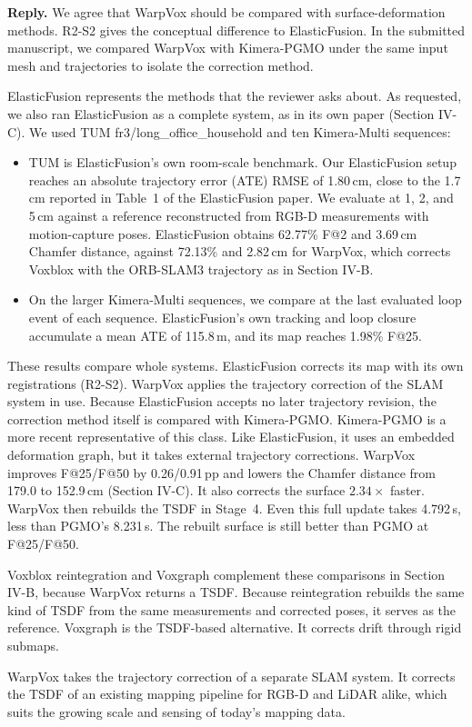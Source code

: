 \documentclass[11pt,a4paper]{article}
\newenvironment{reply}{\begingroup\color{replyblue}\textbf{Reply.} }{\par\endgroup}
\begin{document}
\begin{reply}
We agree that WarpVox should be compared with surface-deformation methods. R2-S2 gives the conceptual difference to ElasticFusion. In the submitted manuscript, we compared WarpVox with Kimera-PGMO under the same input mesh and trajectories to isolate the correction method.

ElasticFusion represents the methods that the reviewer asks about. As requested, we also ran ElasticFusion as a complete system, as in its own paper (Section IV-C). We used TUM fr3/long\_office\_household and ten Kimera-Multi sequences:
\begin{itemize}[leftmargin=*,topsep=2pt,itemsep=2pt]
\item TUM is ElasticFusion's own room-scale benchmark. Our ElasticFusion setup reaches an absolute trajectory error (ATE) RMSE of 1.80\,cm, close to the 1.7\,cm reported in Table~1 of the ElasticFusion paper. We evaluate at 1, 2, and 5\,cm against a reference reconstructed from RGB-D measurements with motion-capture poses. ElasticFusion obtains 62.77\% F@2 and 3.69\,cm Chamfer distance, against 72.13\% and 2.82\,cm for WarpVox, which corrects Voxblox with the ORB-SLAM3 trajectory as in Section IV-B.
\item On the larger Kimera-Multi sequences, we compare at the last evaluated loop event of each sequence. ElasticFusion's own tracking and loop closure accumulate a mean ATE of 115.8\,m, and its map reaches 1.98\% F@25.
\end{itemize}
These results compare whole systems. ElasticFusion corrects its map with its own registrations (R2-S2). WarpVox applies the trajectory correction of the SLAM system in use. Because ElasticFusion accepts no later trajectory revision, the correction method itself is compared with Kimera-PGMO. Kimera-PGMO is a more recent representative of this class. Like ElasticFusion, it uses an embedded deformation graph, but it takes external trajectory corrections. WarpVox improves F@25/F@50 by 0.26/0.91\,pp and lowers the Chamfer distance from 179.0 to 152.9\,cm (Section IV-C). It also corrects the surface $2.34\times$ faster. WarpVox then rebuilds the TSDF in Stage~4. Even this full update takes 4.792\,s, less than PGMO's 8.231\,s. The rebuilt surface is still better than PGMO at F@25/F@50.

Voxblox reintegration and Voxgraph complement these comparisons in Section IV-B, because WarpVox returns a TSDF. Because reintegration rebuilds the same kind of TSDF from the same measurements and corrected poses, it serves as the reference. Voxgraph is the TSDF-based alternative. It corrects drift through rigid submaps.

WarpVox takes the trajectory correction of a separate SLAM system. It corrects the TSDF of an existing mapping pipeline for RGB-D and LiDAR alike, which suits the growing scale and sensing of today's mapping data.
\end{reply}
\end{document}
